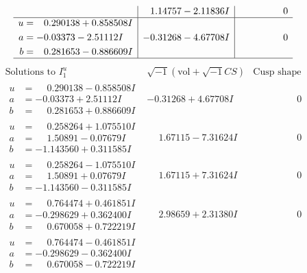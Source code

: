 \documentclass[1p]{elsarticle_modified}
\theoremstyle{definition}
\newcommand{\I}{\sqrt{-1}}
\begin{document}
$$\begin{array}{c|c|c}
 & \phantom{-}1.14757 - 2.11836 I & \phantom{-0.000000 } 0 \\ \hline\begin{aligned}
u &= \phantom{-}0.290138 + 0.858508 I \\
a &= -0.03373 - 2.51112 I \\
b &= \phantom{-}0.281653 - 0.886609 I\end{aligned}
 & -0.31268 - 4.67708 I & \phantom{-0.000000 } 0\\
 \hline 
 \end{array}$$\newpage$$\begin{array}{c|c|c}  
\text{Solutions to }I^u_{1}& \I (\text{vol} + \sqrt{-1}CS) & \text{Cusp shape}\\
 \hline 
\begin{aligned}
u &= \phantom{-}0.290138 - 0.858508 I \\
a &= -0.03373 + 2.51112 I \\
b &= \phantom{-}0.281653 + 0.886609 I\end{aligned}
 & -0.31268 + 4.67708 I & \phantom{-0.000000 } 0 \\ \hline\begin{aligned}
u &= \phantom{-}0.258264 + 1.075510 I \\
a &= \phantom{-}1.50891 - 0.07679 I \\
b &= -1.143560 + 0.311585 I\end{aligned}
 & \phantom{-}1.67115 - 7.31624 I & \phantom{-0.000000 } 0 \\ \hline\begin{aligned}
u &= \phantom{-}0.258264 - 1.075510 I \\
a &= \phantom{-}1.50891 + 0.07679 I \\
b &= -1.143560 - 0.311585 I\end{aligned}
 & \phantom{-}1.67115 + 7.31624 I & \phantom{-0.000000 } 0 \\ \hline\begin{aligned}
u &= \phantom{-}0.764474 + 0.461851 I \\
a &= -0.298629 + 0.362400 I \\
b &= \phantom{-}0.670058 + 0.722219 I\end{aligned}
 & \phantom{-}2.98659 + 2.31380 I & \phantom{-0.000000 } 0 \\ \hline\begin{aligned}
u &= \phantom{-}0.764474 - 0.461851 I \\
a &= -0.298629 - 0.362400 I \\
b &= \phantom{-}0.670058 - 0.722219 I\end{aligned}

\end{array}$$
\end{document}
